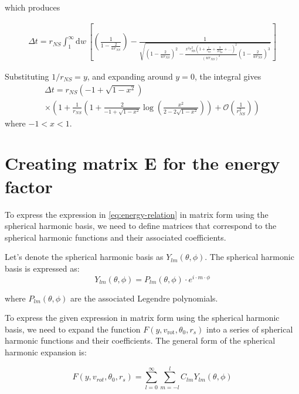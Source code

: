 \documentclass[modern]{aastex631}
\newcommand{\rNS}{r_\mathrm{NS}}
\begin{document}
which produces 
%
\begin{linenomath}\begin{align}
    \label{eq:tdelay-with-x}
    \Delta t = r_{NS} \int_{1}^{\infty} \mathrm{d}w \, \left[\left(\frac{1}{1-\frac{2}{wr_{NS}}}\right) - \frac{1}{\sqrt{\left(1-\frac{2}{wr_{NS}}\right)^2 - \frac{x^2 \rNS^2 \left( 1 + \frac{1}{\rNS} + \frac{3}{2 \rNS^2} + \ldots \right)^2}{(wr_{NS})^2}\left(1-\frac{2}{wr_{NS}}\right)^3}}\right]
\end{align}\end{linenomath}
%
Substituting $1/r_{NS} = y$, and expanding around $y=0$, the integral gives
%
\begin{multline}
    \label{eq:tdelay-solved}
    \Delta t = r_{NS} \left( -1 + \sqrt{1 - x^2} \right) \\ \times \left( 1 + \frac{1}{r_{NS}} \left( 1  + \frac{2}{-1 + \sqrt{1 - x^2}} \log\left( \frac{x^2}{2 - 2 \sqrt{1 - x^2}} \right) \right) + \mathcal{O}\left( \frac{1}{r_{NS}^2} \right) \right)
\end{multline}
where $-1<x<1$.

\section{Creating matrix E for the energy factor}
To express the expression in \ref{eq:energy-relation} in matrix form using the spherical harmonic basis, we need to define matrices 
that correspond to the spherical harmonic functions and their associated coefficients. 

Let's denote the spherical harmonic basis as $Y_{lm}(\theta, \phi)$. The spherical harmonic basis is expressed as:
\begin{equation}
    \label{eq:spherical-harmonics}
    Y_{lm}(\theta, \phi) = P_{lm}(\theta, \phi) \cdot e^{i \cdot m \cdot \phi}
\end{equation}

where $P_{lm}(\theta, \phi)$ are the associated Legendre polynomials.

To express the given expression in matrix form using the spherical harmonic basis, we need to expand the function \( F(y, v_{\text{rot}}, \theta_0, r_s) \) 
into a series of spherical harmonic functions and their coefficients. The general form of the spherical harmonic expansion is:

\begin{equation}
    F(y, v_{rot}, \theta_0, r_s) = \sum_{l=0}^{\infty} \sum_{m=-l}^{l} C_{lm} Y_{lm}(\theta, \phi) 
\end{equation}
\end{document}
